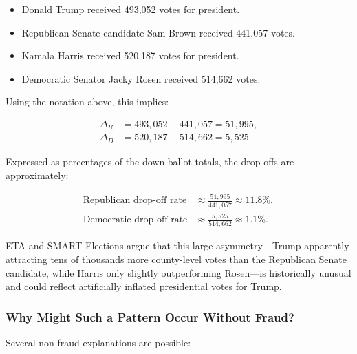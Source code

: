 \documentclass[12pt]{article}
\begin{document}
\begin{itemize}
    \item Donald Trump received 493,052 votes for president.
    \item Republican Senate candidate Sam Brown received 441,057 votes.
    \item Kamala Harris received 520,187 votes for president.
    \item Democratic Senator Jacky Rosen received 514,662 votes.
\end{itemize}

Using the notation above, this implies:

\begin{align*}
    \Delta_R &= 493{,}052 - 441{,}057 = 51{,}995, \\[4pt]
    \Delta_D &= 520{,}187 - 514{,}662 = 5{,}525.
\end{align*}

Expressed as percentages of the down-ballot totals, the drop-offs are approximately:

\begin{align*}
    \text{Republican drop-off rate} &\approx \frac{51{,}995}{441{,}057} \approx 11.8\%, \\[4pt]
    \text{Democratic drop-off rate} &\approx \frac{5{,}525}{514{,}662} \approx 1.1\%.
\end{align*}

ETA and SMART Elections argue that this large asymmetry---Trump apparently attracting tens of thousands more county-level votes than the Republican Senate candidate, while Harris only slightly outperforming Rosen---is historically unusual and could reflect artificially inflated presidential votes for Trump.

\subsubsection{Why Might Such a Pattern Occur Without Fraud?}

Several non-fraud explanations are possible:
\end{document}
